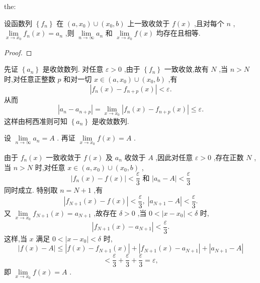 \begin{theorem}{}{the:}

\end{theorem}
 设函数列 \(\left\{  {f}_{n}\right\}\) 在 \(\left( {a,{x}_{0}}\right)  \cup  \left( {{x}_{0},b}\right)\) 上一致收敛于 \(f\left( x\right)\) ,且对每个 \(n\) , \(\mathop{\lim }\limits_{{x \rightarrow  {x}_{0}}}{f}_{n}\left( x\right)  = {a}_{n}\) ,则 \(\mathop{\lim }\limits_{{n \rightarrow  \infty }}{a}_{n}\) 和 \(\mathop{\lim }\limits_{{x \rightarrow  {x}_{0}}}f\left( x\right)\) 均存在且相等.

\begin{proof}

\end{proof}
先证 \(\left\{  {a}_{n}\right\}\) 是收敛数列. 对任意 \(\varepsilon  > 0\) ,由于 \(\left\{  {f}_{n}\right\}\) 一致收敛,故有 \(N\) ,当 \(n > N\) 时,对任意正整数 \(p\) 和对一切 \(x \in  \left( {a,{x}_{0}}\right)  \cup  \left( {{x}_{0},b}\right)\) ,有
\[
\left| {{f}_{n}\left( x\right)  - {f}_{n + p}\left( x\right) }\right|  < \varepsilon . \tag{1}
\]
从而
\[
\left| {{a}_{n} - {a}_{n + p}}\right|  = \mathop{\lim }\limits_{{x \rightarrow  {x}_{0}}}\left| {{f}_{n}\left( x\right)  - {f}_{n + p}\left( x\right) }\right|  \leq  \varepsilon .
\]
这样由柯西准则可知 \(\left\{  {a}_{n}\right\}\) 是收敛数列.

设 \(\mathop{\lim }\limits_{{n \rightarrow  \infty }}{a}_{n} = A\) . 再证 \(\mathop{\lim }\limits_{{x \rightarrow  {x}_{0}}}f\left( x\right)  = A\) .

由于 \({f}_{n}\left( x\right)\) 一致收敛于 \(f\left( x\right)\) 及 \({a}_{n}\) 收敛于 \(A\) ,因此对任意 \(\varepsilon  > 0\) ,存在正数 \(N\) ,当 \(n > N\) 时,对任意 \(x \in  \left( {a,{x}_{0}}\right)  \cup  \left( {{x}_{0},b}\right)\) ,
\[
\left| {{f}_{n}\left( x\right)  - f\left( x\right) }\right|  < \frac{\varepsilon }{3}\text{ 和 }\left| {{a}_{n} - A}\right|  < \frac{\varepsilon }{3}
\]
同时成立. 特别取 \(n = N + 1\) ,有
\[
\left| {{f}_{N + 1}\left( x\right)  - f\left( x\right) }\right|  < \frac{\varepsilon }{3},\;\left| {{a}_{N + 1} - A}\right|  < \frac{\varepsilon }{3}.
\]
又 \(\mathop{\lim }\limits_{{x \rightarrow  {x}_{0}}}{f}_{N + 1}\left( x\right)  = {a}_{N + 1}\) ,故存在 \(\delta  > 0\) ,当 \(0 < \left| {x - {x}_{0}}\right|  < \delta\) 时,
\[
\left| {{f}_{N + 1}\left( x\right)  - {a}_{N + 1}}\right|  < \frac{\varepsilon }{3}.
\]
这样,当 \(x\) 满足 \(0 < \left| {x - {x}_{0}}\right|  < \delta\) 时,
\[
\left| {f\left( x\right)  - A}\right|  \leq  \left| {f\left( x\right)  - {f}_{N + 1}\left( x\right) }\right|  + \left| {{f}_{N + 1}\left( x\right)  - {a}_{N + 1}}\right|  + \left| {{a}_{N + 1} - A}\right|
\]
\[
< \frac{\varepsilon }{3} + \frac{\varepsilon }{3} + \frac{\varepsilon }{3} = \varepsilon ,
\]
即 \(\mathop{\lim }\limits_{{x \rightarrow  {x}_{0}}}f\left( x\right)  = A\) .

